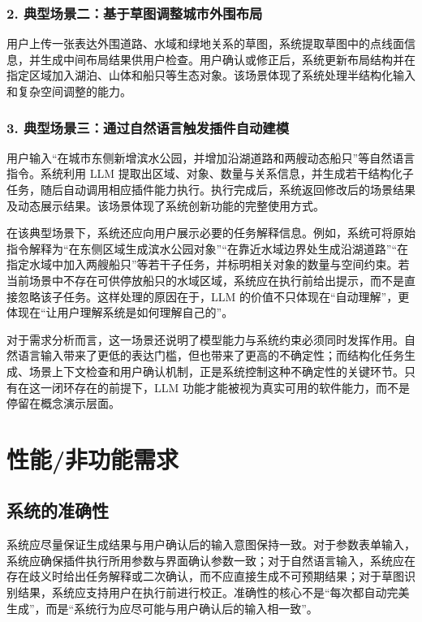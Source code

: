 \documentclass[UTF8,a4paper,10pt]{ctexart}
\begin{document}
\subsubsection*{2. 典型场景二：基于草图调整城市外围布局}
用户上传一张表达外围道路、水域和绿地关系的草图，系统提取草图中的点线面信息，并生成中间布局结果供用户检查。用户确认或修正后，系统更新布局结构并在指定区域加入湖泊、山体和船只等生态对象。该场景体现了系统处理半结构化输入和复杂空间调整的能力。

\subsubsection*{3. 典型场景三：通过自然语言触发插件自动建模}
用户输入“在城市东侧新增滨水公园，并增加沿湖道路和两艘动态船只”等自然语言指令。系统利用 LLM 提取出区域、对象、数量与关系信息，并生成若干结构化子任务，随后自动调用相应插件能力执行。执行完成后，系统返回修改后的场景结果及动态展示结果。该场景体现了系统创新功能的完整使用方式。

在该典型场景下，系统还应向用户展示必要的任务解释信息。例如，系统可将原始指令解释为“在东侧区域生成滨水公园对象”“在靠近水域边界处生成沿湖道路”“在指定水域中加入两艘船只”等若干子任务，并标明相关对象的数量与空间约束。若当前场景中不存在可供停放船只的水域区域，系统应在执行前给出提示，而不是直接忽略该子任务。这样处理的原因在于，LLM 的价值不只体现在“自动理解”，更体现在“让用户理解系统是如何理解自己的”。

对于需求分析而言，这一场景还说明了模型能力与系统约束必须同时发挥作用。自然语言输入带来了更低的表达门槛，但也带来了更高的不确定性；而结构化任务生成、场景上下文检查和用户确认机制，正是系统控制这种不确定性的关键环节。只有在这一闭环存在的前提下，LLM 功能才能被视为真实可用的软件能力，而不是停留在概念演示层面。

\section{性能/非功能需求}

\subsection{系统的准确性}
系统应尽量保证生成结果与用户确认后的输入意图保持一致。对于参数表单输入，系统应确保插件执行所用参数与界面确认参数一致；对于自然语言输入，系统应在存在歧义时给出任务解释或二次确认，而不应直接生成不可预期结果；对于草图识别结果，系统应支持用户在执行前进行校正。准确性的核心不是“每次都自动完美生成”，而是“系统行为应尽可能与用户确认后的输入相一致”。
\end{document}
